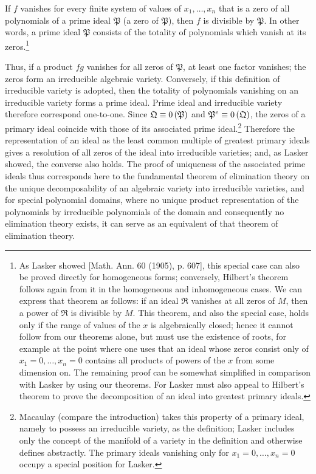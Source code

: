 \documentclass[11pt]{article}
\providecommand{\ideal}[1]{\mathfrak{#1}}
\begin{document}
If $f$ vanishes for every finite system of values of $x_1,
\ldots,x_n$ that is a zero of all polynomials of a prime ideal $\ideal P$ (a zero of $\ideal P$), then $f$ is divisible by $\ideal P$. In other words, a prime ideal $\ideal P$ consists of the totality of polynomials which vanish at its zeros.\footnote{As Lasker showed [Math. Ann. 60 (1905), p. 607], this special case can also be proved directly for homogeneous forms; conversely, Hilbert's theorem follows again from it in the homogeneous and inhomogeneous cases. We can express that theorem as follows: if an ideal $\ideal R$ vanishes at all zeros of $M$, then a power of $\ideal R$ is divisible by $M$. This theorem, and also the special case, holds only if the range of values of the $x$ is algebraically closed; hence it cannot follow from our theorems alone, but must use the existence of roots, for example at the point where one uses that an ideal whose zeros consist only of $x_1=0,
\ldots,x_n=0$ contains all products of powers of the $x$ from some dimension on. The remaining proof can be somewhat simplified in comparison with Lasker by using our theorems. For Lasker must also appeal to Hilbert's theorem to prove the decomposition of an ideal into greatest primary ideals.}

Thus, if a product $fg$ vanishes for all zeros of $\ideal P$, at least one factor vanishes; the zeros form an irreducible algebraic variety. Conversely, if this definition of irreducible variety is adopted, then the totality of polynomials vanishing on an irreducible variety forms a prime ideal. Prime ideal and irreducible variety therefore correspond one-to-one. Since $\ideal Q\eqzero{\ideal P}$ and $\ideal P^e\eqzero{\ideal Q}$, the zeros of a primary ideal coincide with those of its associated prime ideal.\footnote{Macaulay (compare the introduction) takes this property of a primary ideal, namely to possess an irreducible variety, as the definition; Lasker includes only the concept of the manifold of a variety in the definition and otherwise defines abstractly. The primary ideals vanishing only for $x_1=0,
\ldots,x_n=0$ occupy a special position for Lasker.} Therefore the representation of an ideal as the least common multiple of greatest primary ideals gives a resolution of all zeros of the ideal into irreducible varieties; and, as Lasker showed, the converse also holds. The proof of uniqueness of the associated prime ideals thus corresponds here to the fundamental theorem of elimination theory on the unique decomposability of an algebraic variety into irreducible varieties, and for special polynomial domains, where no unique product representation of the polynomials by irreducible polynomials of the domain and consequently no elimination theory exists, it can serve as an equivalent of that theorem of elimination theory.
\end{document}
